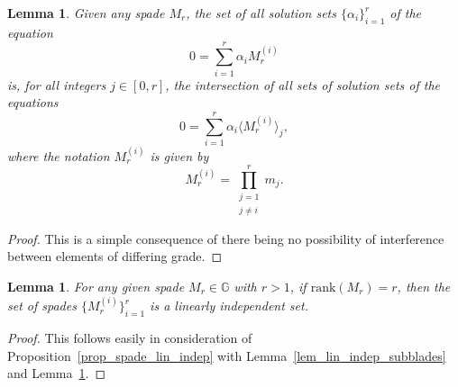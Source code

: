\documentclass{birkjour}
\newtheorem{lem}[thm]{Lemma}
\theoremstyle{definition}
\theoremstyle{remark}
\numberwithin{equation}{section}
\newcommand{\G}{\mathbb{G}}
\newcommand{\rank}{\mbox{rank}}
\begin{document}
\begin{lem}\label{lem_solution_intersection}
Given any spade $M_r$, the set of all solution sets $\{\alpha_i\}_{i=1}^r$ of the equation
\begin{equation*}
0 = \sum_{i=1}^r\alpha_i M_r^{(i)}
\end{equation*}
is, for all integers $j\in[0,r]$, the intersection of all sets of solution sets of the equations
\begin{equation*}
0 = \sum_{i=1}^r\alpha_i\langle M_r^{(i)}\rangle_j,
\end{equation*}
where the notation $M_r^{(i)}$ is given by
\begin{equation*}
M_r^{(i)}=\prod_{\substack{j=1\\j\neq i}}^r m_j.
\end{equation*}
\end{lem}
\begin{proof}
This is a simple consequence of there being no possibility of interference between elements of differing grade.
\end{proof}

\begin{lem}
For any given spade $M_r\in\G$ with $r>1$, if $\rank(M_r)=r$, then
the set of spades $\{M_r^{(i)}\}_{i=1}^r$ is a linearly independent set.
\end{lem}
\begin{proof}
This follows easily in consideration of Proposition~\ref{prop_spade_lin_indep} with Lemma~\ref{lem_lin_indep_subblades} and Lemma~\ref{lem_solution_intersection}.
\end{proof}

\end{document}
